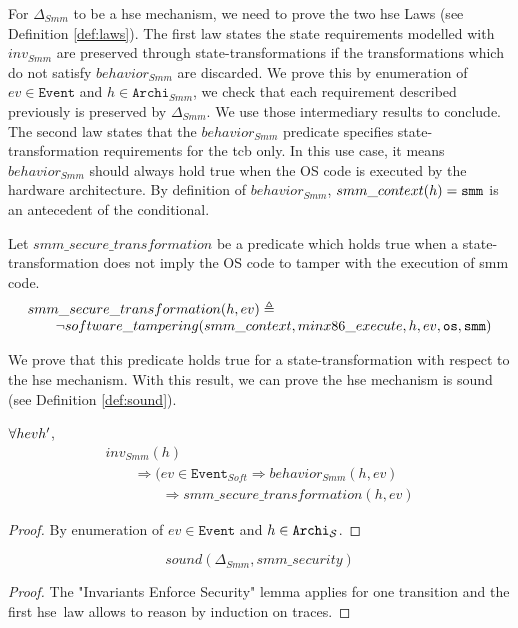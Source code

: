 For $\Delta_{Smm}$ to be a \ac{hse} mechanism, we need to prove the two \ac{hse}
Laws (see Definition \ref{def:laws}).
%
The first law states the state requirements modelled with $inv_{Smm}$ are
preserved through state-transformations if the transformations which do not
satisfy $behavior_{Smm}$ are discarded.
%
We prove this by enumeration of $ev \in \texttt{Event}$ and
$h \in \texttt{Archi}_{Smm}$, we check that each requirement described
previously is preserved by $\Delta_{Smm}$.
%
We use those intermediary results to conclude.
%
The second law states that the $behavior_{Smm}$ predicate specifies
state-trans\-formation requirements for the \ac{tcb} only.
%
In this use case, it means $behavior_{Smm}$ should always hold true when the OS
code is executed by the hardware architecture.
%
By definition of $behavior_{Smm}$, $smm\_context(h) = \mathtt{smm}$ is an
antecedent of the conditional.

Let $smm\_secure\_transformation$ be a predicate which holds true when a
state-transformation does not imply the OS code to tamper with the execution of
\ac{smm} code.
\[ \begin{array}{l}
     smm\_secure\_transformation(h, ev) \triangleq \\
     \qquad \neg software\_tampering(smm\_context, minx86\_execute, h, ev,
     \mathtt{os}, \mathtt{smm})
   \end{array} \]

 We prove that this predicate holds true for a state-transformation with respect
 to the \ac{hse} mechanism. With this result, we can prove the \ac{hse}
 mechanism is sound (see Definition \ref{def:sound}).

\begin{lemma}
  $\forall \transitionLTS{Smmx86}{h}{ev}{h'}$,
  \[ \begin{array}{l}
       inv_{Smm}(h) \\
       \qquad \Rightarrow (ev \in \texttt{Event}_{Soft} \Rightarrow
       behavior_{Smm}(h,ev) \\
       \qquad\qquad \Rightarrow smm\_secure\_transformation(h, ev)
     \end{array} \]

  \begin{proof}
    By enumeration of $ev \in \texttt{Event}$ and
    $h \in \texttt{Archi}_{\mathcal{S}}$.
  \end{proof}
\end{lemma}

\begin{theorem}
  \[ sound(\Delta_{Smm}, smm\_security) \]
  \begin{proof}
    The "Invariants Enforce Security" lemma applies for one transition and the
    first \ac{hse} law allows to reason by induction on traces.
  \end{proof}
\end{theorem}


